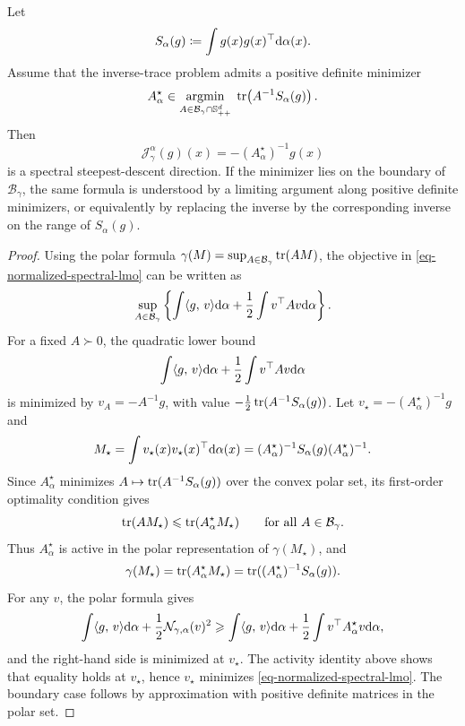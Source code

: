 \begin{prop}\label{prop-normalized-spectral-lmo-polar}
	Let
	\[
		S_\alpha(g)\coloneqq\int g(x)g(x)^\top\mathrm{d}\alpha(x).
	\]
	Assume that the inverse-trace problem admits a positive definite minimizer
	\[
		A_\alpha^\star
		\in
		\underset{A\in\mathcal B_\gamma\cap\mathbb S_{++}^d}{\operatorname{argmin}}\;
		\operatorname{tr}\!\left(A^{-1}S_\alpha(g)\right).
	\]
	Then
	\begin{equation}\label{eq-normalized-spectral-lmo-explicit}
		\mathcal J_{\gamma}^{\alpha}(g)(x)=-(A_\alpha^\star)^{-1}g(x)
	\end{equation}
	is a spectral steepest-descent direction. If the minimizer lies on the boundary of $\mathcal B_\gamma$, the same formula is understood by a limiting argument along positive definite minimizers, or equivalently by replacing the inverse by the corresponding inverse on the range of $S_\alpha(g)$.
\end{prop}
\begin{proof}
	Using the polar formula $\gamma(M)=\sup_{A\in\mathcal B_\gamma}\operatorname{tr}(AM)$, the objective in \eqref{eq-normalized-spectral-lmo} can be written as
	\[
		\sup_{A\in\mathcal B_\gamma}
		\left\{
		\int \langle g,\,v\rangle\mathrm{d}\alpha
		+
		\frac12\int v^\top A v\mathrm{d}\alpha
		\right\}.
	\]
	For a fixed $A\succ0$, the quadratic lower bound
	\[
		\int \langle g,\,v\rangle\mathrm{d}\alpha+\frac12\int v^\top A v\mathrm{d}\alpha
	\]
	is minimized by $v_A=-A^{-1}g$, with value $-\frac12\operatorname{tr}(A^{-1}S_\alpha(g))$. Let $v_\star=-(A_\alpha^\star)^{-1}g$ and
	\[
		M_\star=\int v_\star(x)v_\star(x)^\top\mathrm{d}\alpha(x)
		=
		(A_\alpha^\star)^{-1}S_\alpha(g)(A_\alpha^\star)^{-1}.
	\]
	Since $A_\alpha^\star$ minimizes $A\mapsto\operatorname{tr}(A^{-1}S_\alpha(g))$ over the convex polar set, its first-order optimality condition gives
	\[
		\operatorname{tr}(AM_\star)\leqslant \operatorname{tr}(A_\alpha^\star M_\star)
		\qquad
		\text{for all } A\in\mathcal B_\gamma.
	\]
	Thus $A_\alpha^\star$ is active in the polar representation of $\gamma(M_\star)$, and
	\[
		\gamma(M_\star)=\operatorname{tr}(A_\alpha^\star M_\star)
		=
		\operatorname{tr}((A_\alpha^\star)^{-1}S_\alpha(g)).
	\]
	For any $v$, the polar formula gives
	\[
		\int \langle g,\,v\rangle\mathrm{d}\alpha+\frac12\mathcal N_{\gamma,\alpha}(v)^2
		\geqslant
		\int \langle g,\,v\rangle\mathrm{d}\alpha+\frac12\int v^\top A_\alpha^\star v\mathrm{d}\alpha,
	\]
	and the right-hand side is minimized at $v_\star$. The activity identity above shows that equality holds at $v_\star$, hence $v_\star$ minimizes \eqref{eq-normalized-spectral-lmo}. The boundary case follows by approximation with positive definite matrices in the polar set.
\end{proof}

